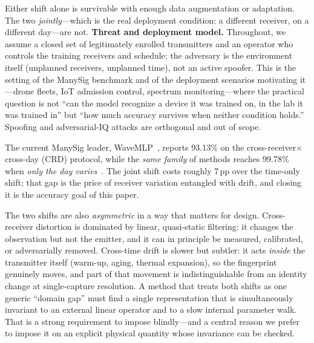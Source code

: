 \documentclass[journal]{IEEEtran}
\begin{document}
Either shift alone is survivable with enough data augmentation or adaptation. The two \emph{jointly}---which is the real deployment condition: a different receiver, on a different day---are not. \textbf{Threat and deployment model.} Throughout, we assume a closed set of legitimately enrolled transmitters and an operator who controls the training receivers and schedule; the adversary is the environment itself (unplanned receivers, unplanned time), not an active spoofer. This is the setting of the ManySig benchmark and of the deployment scenarios motivating it---drone fleets, IoT admission control, spectrum monitoring---where the practical question is not ``can the model recognize a device it was trained on, in the lab it was trained in'' but ``how much accuracy survives when neither condition holds.'' Spoofing and adversarial-IQ attacks are orthogonal and out of scope.

The current ManySig leader, WaveMLP~\cite{wavemlp}, reports 93.13\% on the cross-receiver$\times$cross-day (CRD) protocol, while the \emph{same family} of methods reaches 99.78\% when \emph{only the day varies}~\cite{belfast2026}. The joint shift costs roughly 7\,pp over the time-only shift; that gap is the price of receiver variation entangled with drift, and closing it is the accuracy goal of this paper.

The two shifts are also \emph{asymmetric} in a way that matters for design. Cross-receiver distortion is dominated by linear, quasi-static filtering: it changes the observation but not the emitter, and it can in principle be measured, calibrated, or adversarially removed. Cross-time drift is slower but subtler: it acts \emph{inside} the transmitter itself (warm-up, aging, thermal expansion), so the fingerprint genuinely moves, and part of that movement is indistinguishable from an identity change at single-capture resolution. A method that treats both shifts as one generic ``domain gap'' must find a single representation that is simultaneously invariant to an external linear operator and to a slow internal parameter walk. That is a strong requirement to impose blindly---and a central reason we prefer to impose it on an explicit physical quantity whose invariance can be checked.
\end{document}
